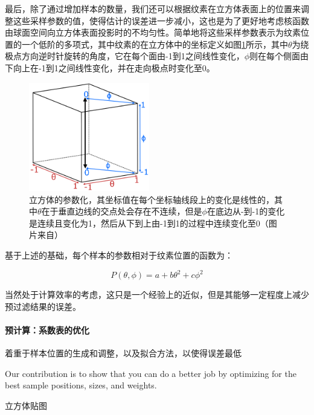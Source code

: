 最后，除了通过增加样本的数量，我们还可以根据纹素在立方体表面上的位置来调整这些采样参数的值，使得估计的误差进一步减小，这也是为了更好地考虑核函数由球面空间向立方体表面投影时的不均匀性。\cite{a:FastFilteringofReflectionProbes}简单地将这些采样参数表示为纹素位置的一个低阶的多项式，其中纹素的在立方体中的坐标定义如图\ref{f:pl-polynomials}所示，其中$\theta$为绕极点方向逆时针旋转的角度，它在每个面由-1到1之间线性变化，$\phi$则在每个侧面由下向上在-1到1之间线性变化，并在走向极点时变化至0。

\begin{figure}
	\sidecaption
	\includegraphics[width=0.47\textwidth]{figures/pl/polynomials}
	\caption{立方体的参数化，其坐标值在每个坐标轴线段上的变化是线性的，其中$\theta$在于垂直边线的交点处会存在不连续，但是$\phi$在底边从-到-1的变化是连续且变化为1，然后从下到上由-1到1的过程中连续变化至0（图片来自\cite{a:FastFilteringofReflectionProbes}）}
	\label{f:pl-polynomials}
\end{figure}

基于上述的基础，每个样本的参数相对于纹素位置的函数为：

\begin{equation}
	P(\theta,\phi)=a+b\theta^{2}+c\phi^{2}
\end{equation}

当然处于计算效率的考虑，这只是一个经验上的近似，但是其能够一定程度上减少预过滤结果的误差。



\paragraph{预计算：系数表的优化}


着重于样本位置的生成和调整，以及拟合方法，以使得误差最低



Our contribution is to show that you can do a better job by optimizing for the best sample positions, sizes, and weights.


立方体贴图

